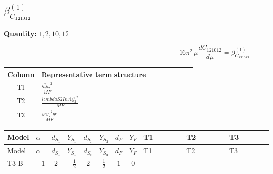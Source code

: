 \documentclass[8pt]{article}
\begin{document}
\begin{landscape}
\section*{$\beta_{C_{121012}}^{(1)}$}
\noindent\textbf{Quantity: }$\mathrm{1,2,10,12}$\par\smallskip
\[16\pi^2\,\mu\frac{d C_{121012}}{d\mu}=\beta_{C_{121012}}^{(1)}\]
\begin{center}
\begin{tabular}{@{}c >{\raggedright\arraybackslash}p{0.82\linewidth}@{}}
\toprule
Column & Representative term structure \\
\midrule
T1 & \(\displaystyle \frac{g_{2}^{2} \overline{y_{2}}^{2}}{MF}\) \\
\midrule
T2 & \(\displaystyle \frac{lambdaS2Inv1 \overline{y_{2}}^{2}}{MF}\) \\
\midrule
T3 & \(\displaystyle \frac{ye \overline{y_{2}}^{2} \overline{ye}}{MF}\) \\
\midrule
\bottomrule
\end{tabular}
\end{center}
\smallskip
\tiny
\begin{longtable}{@{}llcccccc >{\raggedright\arraybackslash}p{0.21\linewidth} >{\raggedright\arraybackslash}p{0.21\linewidth} >{\raggedright\arraybackslash}p{0.21\linewidth}@{}}
\toprule
Model & $\alpha$ & $d_{S_1}$ & $Y_{S_1}$ & $d_{S_2}$ & $Y_{S_2}$ & $d_F$ & $Y_F$ & T1 & T2 & T3 \\
\midrule
\endfirsthead
\toprule
Model & $\alpha$ & $d_{S_1}$ & $Y_{S_1}$ & $d_{S_2}$ & $Y_{S_2}$ & $d_F$ & $Y_F$ & T1 & T2 & T3 \\
\midrule
\endhead
T3-B & $-1$ & $2$ & $-\frac{1}{2}$ & $2$ & $\frac{1}{2}$ & $1$ & $0$ & \scriptsize\adjustbox{max width=\linewidth}{$\begin{gathered} - \frac{3 g_{2}^{2} \overline{y_{2}}^{2}}{8 MF}\end{gathered}$} & \scriptsize\adjustbox{max width=\linewidth}{$\begin{gathered} - \frac{lambdaS2Inv1 \overline{y_{2}}^{2}}{4 MF}\end{gathered}$} & \scriptsize\adjustbox{max width=\linewidth}{$\begin{gathered} \frac{ye \overline{y_{2}}^{2} \overline{ye}}{8 MF}\end{gathered}$} \\
\midrule
\bottomrule
\end{longtable}
\clearpage

\end{landscape}
\end{document}
